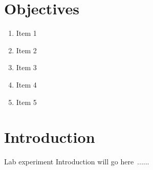 \section*{Objectives}
\begin{enumerate}
    \item Item 1
    \item Item 2
    \item Item 3
    \item Item 4
    \item Item 5
\end{enumerate}


\section*{Introduction}
Lab experiment Introduction will go here~\cite{Chaumet2009,Kim2013a}......

